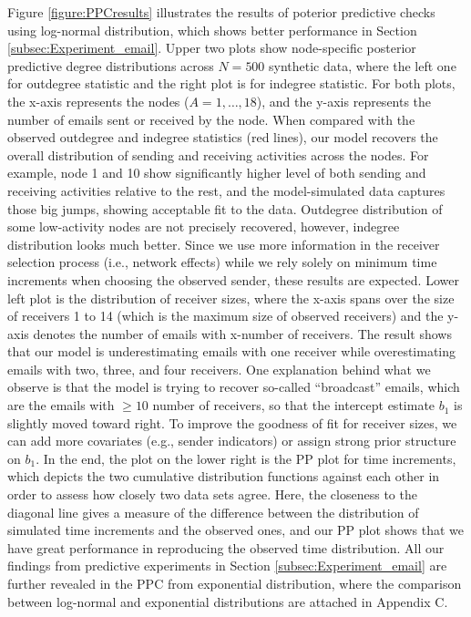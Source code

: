 \documentclass[ba]{imsart}
\numberwithin{equation}{section}
\theoremstyle{plain}
\begin{document}
	Figure \ref{figure:PPCresults} illustrates the results of poterior predictive checks using log-normal distribution, which shows better performance in Section \ref{subsec:Experiment_email}. Upper two plots show node-specific posterior predictive degree distributions across $N=500$ synthetic data, where the left one for outdegree statistic and the right plot is for indegree statistic. For both plots, the x-axis represents the nodes ($A=1,\ldots,18$), and the y-axis represents the number of emails sent or received by the node. When compared with the observed outdegree and indegree statistics (red lines), our model recovers the overall distribution of sending and receiving activities across the nodes. For example, node 1 and 10 show significantly higher level of both sending and receiving activities relative to the rest, and the model-simulated data captures those big jumps, showing acceptable fit to the data. Outdegree distribution of some low-activity nodes are not precisely recovered, however, indegree distribution looks much better. Since we use more information in the receiver selection process (i.e., network effects) while we rely solely on minimum time increments when choosing the observed sender, these results are expected. Lower left plot is the distribution of receiver sizes, where the x-axis spans over the size of receivers 1 to 14 (which is the maximum size of observed receivers) and the y-axis denotes the number of emails with x-number of receivers. The result shows that our model is underestimating emails with one receiver while overestimating emails with two, three, and four receivers. One explanation behind what we observe is that the model is trying to recover so-called ``broadcast'' emails, which are the emails with $\geq 10$ number of receivers, so that the intercept estimate $b_1$ is slightly moved toward right. To improve the goodness of fit for receiver sizes, we can add more covariates (e.g., sender indicators) or assign strong prior structure on $b_1$. In the end, the plot on the lower right is the PP plot for time increments, which depicts the two cumulative distribution functions against each other in order to assess how closely two data sets agree. Here, the closeness to the diagonal line gives a measure of the difference between the distribution of simulated time increments and the observed ones, and our PP plot shows that we have great performance in reproducing the observed time distribution. All our findings from predictive experiments in Section \ref{subsec:Experiment_email} are further revealed in the PPC from exponential distribution, where the comparison between log-normal and exponential distributions are attached in Appendix C.
\end{document}
